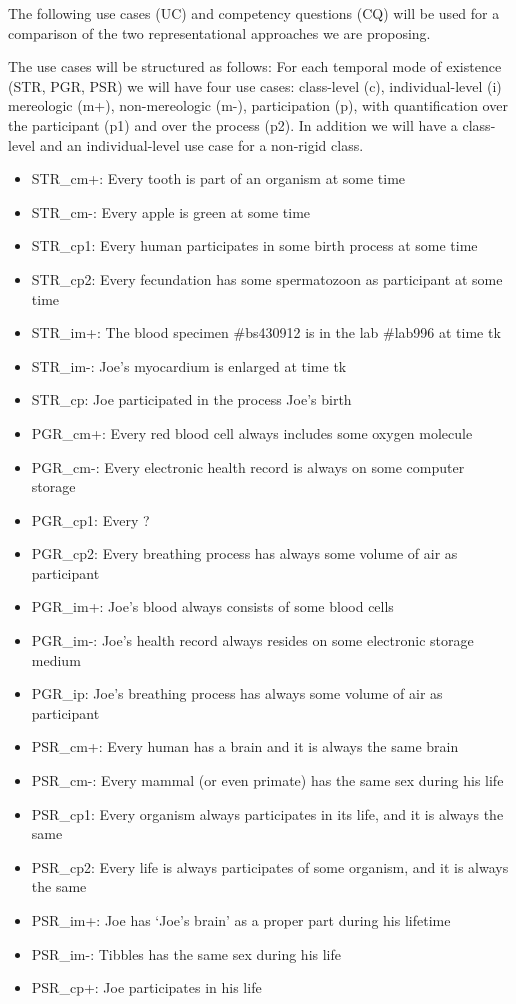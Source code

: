 The following use cases (UC) and competency questions (CQ) will be used for a comparison of the two representational approaches we are proposing. 

The use cases will be structured as follows: For each temporal mode of existence (STR, PGR, PSR) we will have four use cases: 
class-level (c), individual-level (i) mereologic (m+), non-mereologic (m-), participation (p), with quantification over the participant (p1) and over the process (p2). In addition we will have a class-level and an individual-level use case for a non-rigid class. 

\begin{itemize}
\item STR\_cm+: Every tooth is part of an organism at some time
\item STR\_cm-: Every apple is green at some time
\item STR\_cp1: Every human participates in some birth process at some time
\item STR\_cp2: Every fecundation has some spermatozoon as participant at some time
\item STR\_im+: The blood specimen \#bs430912 is in  the lab \#lab996 at time tk
\item STR\_im-: Joe's myocardium is enlarged at time tk
\item STR\_cp:  Joe participated in the process Joe's birth

\item PGR\_cm+: Every red blood cell always includes some oxygen molecule 
\item PGR\_cm-: Every electronic health record is always on some computer storage
\item PGR\_cp1: Every ?  
\item PGR\_cp2: Every breathing process has always some volume of air as participant 
\item PGR\_im+: Joe's blood always consists of some blood cells 
\item PGR\_im-: Joe's health record always resides on some electronic storage medium
\item PGR\_ip:  Joe's breathing process has always some volume of air as participant

\item PSR\_cm+: Every human has a brain and it is always the same brain
\item PSR\_cm-: Every mammal (or even primate) has the same sex during his life 
\item PSR\_cp1: Every organism always participates in its life, and it is always the same
\item PSR\_cp2: Every life is always participates of some organism, and it is always the same
\item PSR\_im+: Joe has `Joe's brain' as a proper part during his lifetime 
\item PSR\_im-: Tibbles has the same sex during his life 
\item PSR\_cp+: Joe participates in his life


\end{itemize}
